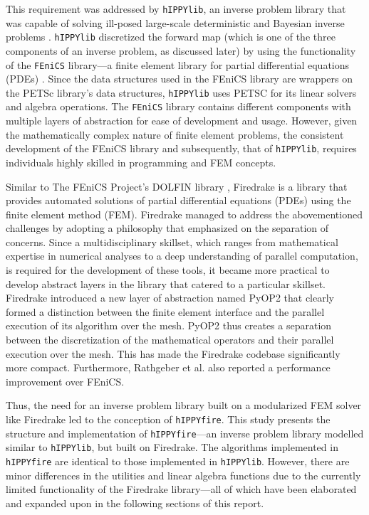 This requirement was addressed by \texttt{hIPPYlib}, an inverse problem library that was capable of solving ill-posed large-scale deterministic and Bayesian inverse problems \cite{villa2018hippylib}. \texttt{hIPPYlib} discretized the forward map (which is one of the three components of an inverse problem, as discussed later) by using the functionality of the \texttt{FEniCS} library---a finite element library for partial differential equations (PDEs) \cite{alnaes2015fenics}. Since the data structures used in the FEniCS library are wrappers on the PETSc library's data structures, \texttt{hIPPYlib} uses PETSC \cite{balay2001petsc} for its linear solvers and algebra operations. The \texttt{FEniCS} library contains different components with multiple layers of abstraction for ease of development and usage. However, given the mathematically complex nature of finite element problems, the consistent development of the FEniCS library and subsequently, that of \texttt{hIPPYlib}, requires individuals highly skilled in programming and FEM concepts.

Similar to The FEniCS Project's DOLFIN library \cite{alnaes2015fenics, logg2010dolfin}, Firedrake \cite{rathgeber2016firedrake} is a library that provides automated solutions of partial differential equations (PDEs) using the finite element method (FEM). Firedrake managed to address the abovementioned challenges by adopting a philosophy that emphasized on the separation of concerns. Since a multidisciplinary skillset, which ranges from mathematical expertise in numerical analyses to a deep understanding of parallel computation, is required for the development of these tools, it became more practical to develop abstract layers in the library that catered to a particular skillset. Firedrake introduced a new layer of abstraction named PyOP2 \cite{rathgeber2012pyop2} that clearly formed a distinction between the finite element interface and the parallel execution of its algorithm over the mesh. PyOP2 thus creates a separation between the discretization of the mathematical operators and their parallel execution over the mesh. This has made the Firedrake codebase significantly more compact. Furthermore, Rathgeber et al. \cite{rathgeber2016firedrake} also reported a performance improvement over FEniCS.

Thus, the need for an inverse problem library built on a modularized FEM solver like Firedrake led to the conception of \texttt{hIPPYfire}. This study presents the structure and implementation of \texttt{hIPPYfire}---an inverse problem library modelled similar to \texttt{hIPPYlib}, but built on Firedrake. The algorithms implemented in \texttt{hIPPYfire} are identical to those implemented in \texttt{hIPPYlib}. However, there are minor differences in the utilities and linear algebra functions due to the currently limited functionality of the Firedrake library---all of which have been elaborated and expanded upon in the following sections of this report.


